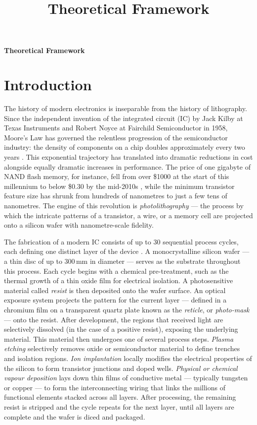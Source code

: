 \documentclass[11pt]{article}
\theoremstyle{definition}
\begin{document}
\setcounter{section}{8}
\title{Theoretical Framework}

\thispagestyle{empty}

\begin{center}
{\LARGE \bf Theoretical Framework}\\
\end{center}

\section{Introduction}

The history of modern electronics is inseparable from the history of lithography. Since the independent invention of the integrated circuit (IC) by Jack Kilby at Texas Instruments and Robert Noyce at Fairchild Semiconductor in 1958, Moore's Law has governed the relentless progression of the semiconductor industry: the density of components on a chip doubles approximately every two years \cite{Schmidt2012_UltraPrecision}. This exponential trajectory has translated into dramatic reductions in cost alongside equally dramatic increases in performance. The price of one gigabyte of NAND flash memory, for instance, fell from over \$1000 at the start of this millennium to below \$0.30 by the mid-2010s \cite{Butler2011_PositionControl}, while the minimum transistor feature size has shrunk from hundreds of nanometres to just a few tens of nanometres. The engine of this revolution is \textit{photolithography} — the process by which the intricate patterns of a transistor, a wire, or a memory cell are projected onto a silicon wafer with nanometre-scale fidelity.

The fabrication of a modern IC consists of up to 30 sequential process cycles, each defining one distinct layer of the device \cite{Schmidt2012_UltraPrecision}. A monocrystalline silicon wafer — a thin disc of up to 300\,mm in diameter — serves as the substrate throughout this process. Each cycle begins with a chemical pre-treatment, such as the thermal growth of a thin oxide film for electrical isolation. A photosensitive material called \textit{resist} is then deposited onto the wafer surface. An optical exposure system projects the pattern for the current layer — defined in a chromium film on a transparent quartz plate known as the \textit{reticle}, or \textit{photo-mask} — onto the resist. After development, the regions that received light are selectively dissolved (in the case of a positive resist), exposing the underlying material. This material then undergoes one of several process steps. \textit{Plasma etching} selectively removes oxide or semiconductor material to define trenches and isolation regions. \textit{Ion implantation} locally modifies the electrical properties of the silicon to form transistor junctions and doped wells. \textit{Physical or chemical vapour deposition} lays down thin films of conductive metal — typically tungsten or copper — to form the interconnecting wiring that links the millions of functional elements stacked across all layers. After processing, the remaining resist is stripped and the cycle repeats for the next layer, until all layers are complete and the wafer is diced and packaged.
\end{document}
